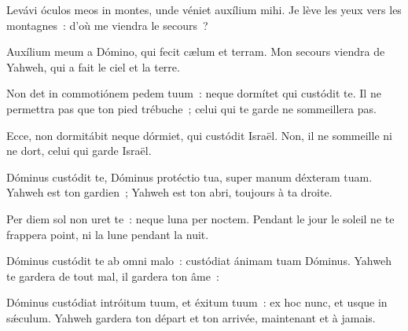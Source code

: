 \begin{paracol}{2}

\LigneParacol{0cm}
{Levávi óculos meos in montes, \GreStar{} unde véniet auxílium mihi.}
{Je lève les yeux vers les montagnes~: d'où me viendra le secours~?}

\LigneParacol{0.2cm}
{Auxílium meum a Dómino, \GreStar{} qui fecit cælum et terram.}
{Mon secours viendra de Yahweh, qui a fait le ciel et la terre.}

\LigneParacol{0.2cm}
{Non det in commotiónem pedem tuum~: \GreStar{} neque dormítet qui custódit te.}
{Il ne permettra pas que ton pied trébuche~; celui qui te garde ne sommeillera pas.}

\LigneParacol{0.2cm}
{Ecce, non dormitábit neque dórmiet, \GreStar{} qui custódit Israël.}
{Non, il ne sommeille ni ne dort, celui qui garde Israël.}

\LigneParacol{0.2cm}
{Dóminus custódit te, Dóminus protéctio tua, \GreStar{} super manum déxteram tuam.}
{Yahweh est ton gardien~; Yahweh est ton abri, toujours à ta droite.}

\LigneParacol{0.2cm}
{Per diem sol non uret te~: \GreStar{} neque luna per noctem.}
{Pendant le jour le soleil ne te frappera point, ni la lune pendant la nuit.}

\LigneParacol{0.2cm}
{Dóminus custódit te ab omni malo~: \GreStar{} custódiat ánimam tuam Dóminus.}
{Yahweh te gardera de tout mal, il gardera ton âme~:}

\LigneParacol{0.2cm}
{Dóminus custódiat intróitum tuum, et éxitum tuum~: \GreStar{} ex hoc nunc, et usque in sǽculum.}
{Yahweh gardera ton départ et ton arrivée, maintenant et à jamais.}

\end{paracol}
\Gloria
{}
